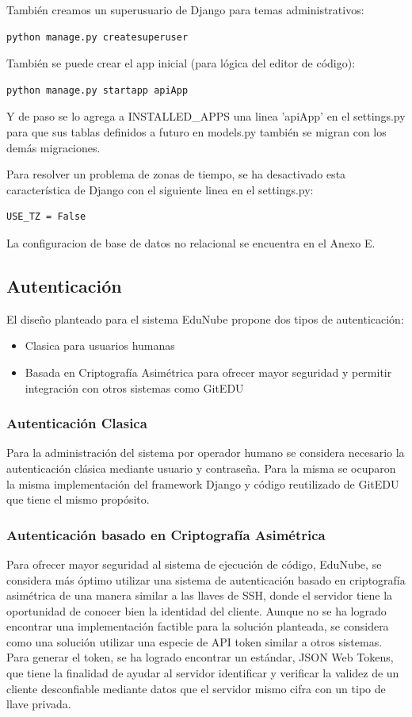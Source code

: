 También creamos un superusuario de Django para temas administrativos:
\begin{lstlisting}
python manage.py createsuperuser
\end{lstlisting}

También se puede crear el app inicial (para lógica del editor de código):
\begin{lstlisting}
python manage.py startapp apiApp
\end{lstlisting}

Y de paso se lo agrega a INSTALLED\_APPS una linea 'apiApp' en el settings.py para que sus tablas definidos a futuro en models.py también se migran con los demás migraciones.

Para resolver un problema de zonas de tiempo, se ha desactivado esta característica de Django con el siguiente linea en el settings.py:
\lstset{language=Python}
\begin{lstlisting}
USE_TZ = False
\end{lstlisting}
\lstset{language=Bash}

La configuracion de base de datos no relacional se encuentra en el Anexo E.

\subsection{Autenticación}
El diseño planteado para el sistema EduNube propone dos tipos de autenticación:
\begin{itemize}
\item Clasica para usuarios humanas
\item Basada en Criptografía Asimétrica para ofrecer mayor seguridad y permitir integración con otros sistemas como GitEDU
\end{itemize}

\subsubsection{Autenticación Clasica}
Para la administración del sistema por operador humano se considera necesario la autenticación clásica mediante usuario y contraseña. Para la misma se ocuparon la misma implementación del framework Django y código reutilizado de GitEDU que tiene el mismo propósito.

\subsubsection{Autenticación basado en Criptografía Asimétrica}
Para ofrecer mayor seguridad al sistema de ejecución de código, EduNube, se considera más óptimo utilizar una sistema de autenticación basado en criptografía asimétrica de una manera similar a las llaves de SSH, donde el servidor tiene la oportunidad de conocer bien la identidad del cliente. Aunque no se ha logrado encontrar una implementación factible para la solución planteada, se considera como una solución utilizar una especie de API token similar a otros sistemas. Para generar el token, se ha logrado encontrar un estándar, JSON Web Tokens, que tiene la finalidad de ayudar al servidor identificar y verificar la validez de un cliente desconfiable mediante datos que el servidor mismo cifra con un tipo de llave privada.

